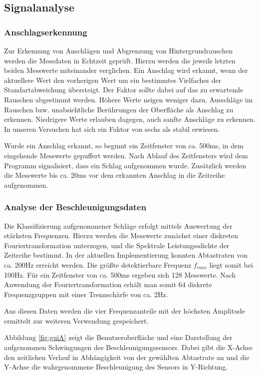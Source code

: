 \subsection{Signalanalyse}
\label{sec:Signalanalyse}
\subsubsection{Anschlagserkennung}
Zur Erkennung von Anschlägen und Abgrenzung von Hintergrundrauschen werden die Messdaten in Echtzeit geprüft. 
Hierzu werden die jeweils letzten beiden Messwerte miteinander verglichen. 
Ein Anschlag wird erkannt, wenn der aktuellere Wert den vorherigen Wert um ein bestimmtes Vielfaches der Standartabweichung übersteigt. 
Der Faktor sollte dabei auf das zu erwartende Rauschen abgestimmt werden.
Höhere Werte neigen weniger dazu, Ausschläge im Rauschen bzw. unabsichtliche Berührungen der Oberfläche als Anschlag zu erkennen.
Niedrigere Werte erlauben dagegen, auch sanfte Anschläge zu erkennen.
In unseren Versuchen hat sich ein Faktor von sechs als stabil erwiesen.

Wurde ein Anschlag erkannt, so beginnt ein Zeitfenster von ca. 500ms, in dem eingehende Messwerte gepuffert werden. 
Nach Ablauf des Zeitfensters wird dem Programm signalisiert, dass ein Schlag aufgenommen wurde. 
Zusätzlich werden die Messwerte bis ca. 20ms vor dem erkannten Anschlag in die Zeitreihe aufgenommen.

\subsubsection{Analyse der Beschleunigungsdaten}
\label{sec:Analyse-a}
Die Klassifizierung aufgenommener Schläge erfolgt mittels Auswertung der stärksten Frequenzen. 
Hierzu werden die Messwerte zunächst einer diskreten Fouriertransformation unterzogen, und die Spektrale Leistungssdichte der Zeitreihe bestimmt.
In der aktuellen Implementierung konnten Abtastraten von ca. 200Hz erreicht werden. 
Die größte detektierbare Frequenz $f_{max}$ liegt somit bei 100Hz.
Für ein Zeitfenster von ca. 500ms ergeben sich 128 Messwerte.
Nach Anwendung der Fouriertransformation erhält man somit 64 diskrete Frequenzgruppen mit einer Trennschärfe von ca. 2Hz.

Aus diesen Daten werden die vier Frequenzanteile mit der höchsten Amplitude ermittelt zur weiteren Verwendung gespeichert.

Abbildung \ref{fig:guiA} zeigt die Benutzeroberfläche und eine Darstellung der aufgenommen Schwingungen des Beschleunigungssensors.
Dabei gibt die X-Achse den zeitlichen Verlauf in Abhängigkeit von der gewählten Abtastrate an und die Y-Achse die wahrgenommene Beschleunigung des Sensors in Y-Richtung.

